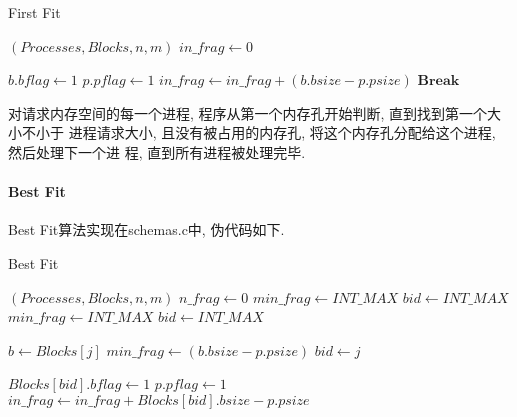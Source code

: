 \begin{algorithm}
    \caption{First Fit}\label{alg:firstfit}
    \begin{algorithmic}[1]
        \Require $(Processes, Blocks, n, m)$
        \State $in\_frag \gets 0$

        \State $b.bflag \gets 1$
        \State $p.pflag \gets 1$
        \State $in\_frag \gets in\_frag + (b.bsize - p.psize)$
        \State $\mathbf{Break}$
        \EndIf

        \EndFor
        \EndFor
    \end{algorithmic}
\end{algorithm}

对请求内存空间的每一个进程, 程序从第一个内存孔开始判断, 直到找到第一个大小不小于
进程请求大小, 且没有被占用的内存孔, 将这个内存孔分配给这个进程, 然后处理下一个进
程, 直到所有进程被处理完毕.

\paragraph{Best Fit}
Best Fit算法实现在schemas.c中, 伪代码如下.
\begin{algorithm}
    \caption{Best Fit}\label{fig:bestfit}
    \begin{algorithmic}[1]
        \Require $(Processes, Blocks, n, m)$
        \State $n\_frag \gets 0$
        \State $min\_frag \gets INT\_MAX$
        \State $bid \gets INT\_MAX$
        \State $ min\_frag \gets INT\_MAX $
        \State $bid \gets INT\_MAX$

        \State $b \gets Blocks[j]$
        \State $min\_frag \gets (b.bsize - p.psize)$
        \State $bid \gets j$
        \EndIf
        \EndFor
        
        \State $Blocks[bid].bflag \gets 1$
        \State $p.pflag \gets 1$
        \State $in\_frag \gets in\_frag + Blocks[bid].bsize - p.psize$
        \EndIf
        
        \EndFor
    \end{algorithmic}
\end{algorithm}
